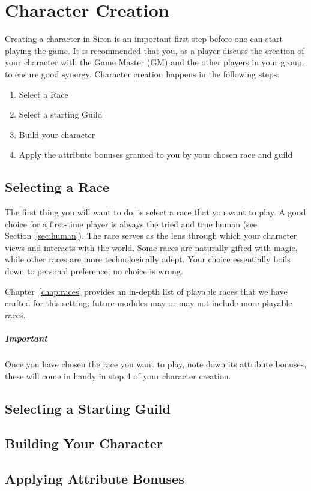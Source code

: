 \chapter{Character Creation}
Creating a character in Siren is an important first step before one can start playing the game.
It is recommended that you, as a player discuss the creation of your character with the Game Master (GM) and the other players in your group, to ensure good synergy.
Character creation happens in the following steps:
\begin{enumerate}
    \item Select a Race 
    \item Select a starting Guild 
    \item Build your character
    \item Apply the attribute bonuses granted to you by your chosen race and guild
\end{enumerate}

\section{Selecting a Race}
The first thing you will want to do, is select a race that you want to play.
A good choice for a first-time player is always the tried and true human (see Section~\ref{sec:human}).
The race serves as the lens through which your character views and interacts with the world.
Some races are naturally gifted with magic, while other races are more technologically adept.
Your choice essentially boils down to personal preference; no choice is wrong.

Chapter~\ref{chap:races} provides an in-depth list of playable races that we have crafted for this setting; future modules may or may not include more playable races.

\paragraph{Important}
Once you have chosen the race you want to play, note down its attribute bonuses, these will come in handy in step 4 of your character creation.

\section{Selecting a Starting Guild}

\section{Building Your Character}

\section{Applying Attribute Bonuses}